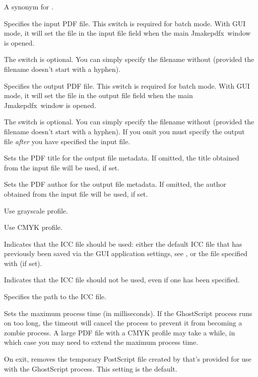 \documentclass[toc=listof]{scrreport}
\newcommand{\Jmakepdfx}{Jmakepdfx}
\begin{document}
A synonym for .

Specifies the input PDF file. This switch is required for batch mode. With
\gls{GUI} mode, it will set the file in the input file field when the main
\Jmakepdfx\ window is opened.

The  switch is optional. You can simply specify the
filename without  (provided the filename doesn't start
with a hyphen).

Specifies the output PDF file. This switch is required for batch mode. With
\gls{GUI} mode, it will set the file in the output file field when the main
\Jmakepdfx\ window is opened.

The  switch is optional. You can simply specify the
filename without  (provided the filename doesn't start
with a hyphen). If you omit  you must specify the
output file \emph{after} you have specified the input file.

Sets the PDF title for the output file metadata. If omitted, the title
obtained from the input file will be used, if set.

Sets the PDF author for the output file metadata. If omitted, the author
obtained from the input file will be used, if set.

Use grayscale profile.

Use CMYK profile.

Indicates that the ICC file should be used: either the default ICC
file that has previously been saved via the \gls{GUI} application
settings, see , or the file specified with
 (if set).

Indicates that the ICC file should not be used, even if one has been specified.

Specifies the path to the ICC file.

Sets the maximum process time (in milliseconds).
If the GhostScript process runs on too long, the timeout will cancel
the process to prevent it from becoming a zombie process.
A large PDF file with a CMYK profile may take a while, in which case
you may need to extend the maximum process time.


On exit, removes the temporary PostScript file created by  that's 
provided for use with the GhostScript process. This setting is the
default.
\end{document}
